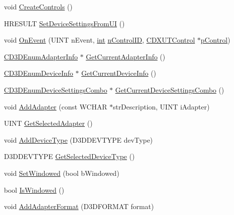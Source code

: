\begin{DoxyCompactItemize}
\item 
void \hyperlink{class_c_d3_d_settings_dlg_ab4f8f21e9d8db02fafb03c346cee8eea}{CreateControls} ()
\item 
HRESULT \hyperlink{class_c_d3_d_settings_dlg_a12d42c7cb4fc734538eeafff7d979215}{SetDeviceSettingsFromUI} ()
\item 
void \hyperlink{class_c_d3_d_settings_dlg_a8ba617f0440a4647d0697e0dadb373b4}{OnEvent} (UINT nEvent, \hyperlink{_d_x_u_tgui_8cpp_a2d77ed03302b6978834ee3b6f57837fb}{int} \hyperlink{_d_x_u_tgui_8h_a73dfd1d736300572e8c3d1a961a52ebf}{nControlID}, \hyperlink{class_c_d_x_u_t_control}{CDXUTControl} $\ast$\hyperlink{_d_x_u_tgui_8h_a02afd33ae98ec4c57be6013765c03be9}{pControl})
\item 
\hyperlink{class_c_d3_d_enum_adapter_info}{CD3DEnumAdapterInfo} $\ast$ \hyperlink{class_c_d3_d_settings_dlg_a541518849e837f4bfead54b3eecfbf6b}{GetCurrentAdapterInfo} ()
\item 
\hyperlink{class_c_d3_d_enum_device_info}{CD3DEnumDeviceInfo} $\ast$ \hyperlink{class_c_d3_d_settings_dlg_ade285a2131356cdbebdcccba78f8734b}{GetCurrentDeviceInfo} ()
\item 
\hyperlink{struct_c_d3_d_enum_device_settings_combo}{CD3DEnumDeviceSettingsCombo} $\ast$ \hyperlink{class_c_d3_d_settings_dlg_ac14dfa0e87ac321dd884928a300589e6}{GetCurrentDeviceSettingsCombo} ()
\item 
void \hyperlink{class_c_d3_d_settings_dlg_af6f11fa22d6c9855beec1de19555df70}{AddAdapter} (const WCHAR $\ast$strDescription, UINT iAdapter)
\item 
UINT \hyperlink{class_c_d3_d_settings_dlg_a7e286e6a7739042c63717a2009f72a64}{GetSelectedAdapter} ()
\item 
void \hyperlink{class_c_d3_d_settings_dlg_aa5015f5a50011606b49984cd24baa347}{AddDeviceType} (D3DDEVTYPE devType)
\item 
D3DDEVTYPE \hyperlink{class_c_d3_d_settings_dlg_a1a4e9165151846c6fb735f3cd0add737}{GetSelectedDeviceType} ()
\item 
void \hyperlink{class_c_d3_d_settings_dlg_a1a8187c3c56b9998c25d7fb4fc1c5ab8}{SetWindowed} (bool bWindowed)
\item 
bool \hyperlink{class_c_d3_d_settings_dlg_a3788a01ff4742e458ba3d117d2bfdde3}{IsWindowed} ()
\item 
void \hyperlink{class_c_d3_d_settings_dlg_a980ec0d429e0c796284f9b1874510a14}{AddAdapterFormat} (D3DFORMAT format)
\item 

\end{DoxyCompactItemize}
